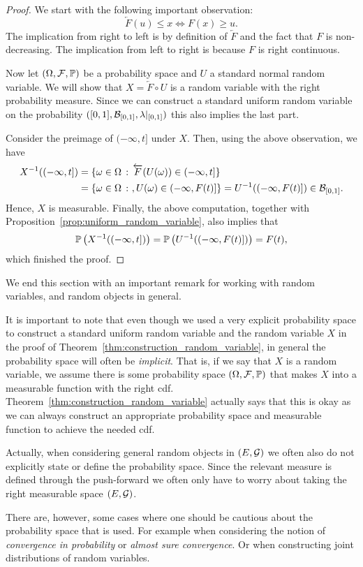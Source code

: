 \begin{proof}
We start with the following important observation: 
\[
	\overleftarrow{F}(u) \le x \iff F(x) \ge u.
\]
The implication from right to left is by definition of $\overleftarrow{F}$ and the fact that $F$ is non-decreasing. The implication from left to right is because $F$ is right continuous.


Now let $(\Omega,\mathcal F, \mathbb P)$ be a probability space and $U$ a standard normal random variable. We will show that $X = \overleftarrow{F} \circ U$ is a random variable with the right probability measure. Since we can construct a standard uniform random variable on the probability $([0,1], \mathcal B_{[0,1]}, \lambda|_{[0,1]})$ this also implies the last part. 

Consider the preimage of $(-\infty, t]$ under $X$. Then, using the above observation, we have
\begin{align*}
	X^{-1}((-\infty,t]) &= \{\omega \in \Omega \, : \, \overleftarrow{F}(U(\omega)) \in (-\infty,t]\}\\
	&= \{\omega \in \Omega \, :\ , U(\omega) \in (-\infty, F(t)]\} = U^{-1}((-\infty, F(t)]) \in \mathcal B_{[0,1]}.
\end{align*}
Hence, $X$ is measurable. Finally, the above computation, together with Proposition~\ref{prop:uniform_random_variable}, also implies that
\[
	\mathbb P\left(X^{-1}((-\infty,t])\right) = \mathbb P\left(U^{-1}((-\infty, F(t)])\right) = F(t),
\]
which finished the proof.
\end{proof}

We end this section with an important remark for working with random variables, and random objects in general.

\begin{remark}
It is important to note that even though we used a very explicit probability space to construct a standard uniform random variable and the random variable $X$ in the proof of Theorem~\ref{thm:construction_random_variable}, in general the probability space will often be \emph{implicit}. That is, if we say that $X$ is a random variable, we assume there is some probability space $(\Omega,\mathcal F, \mathbb P)$ that makes $X$ into a measurable function with the right cdf. Theorem~\ref{thm:construction_random_variable} actually says that this is okay as we can always construct an appropriate probability space and measurable function to achieve the needed cdf.

Actually, when considering general random objects in $(E, \mathcal G)$ we often also do not explicitly state or define the probability space. Since the relevant measure is defined through the push-forward we often only have to worry about taking the right measurable space $(E, \mathcal G)$.

There are, however, some cases where one should be cautious about the probability space that is used. For example when considering the notion of \emph{convergence in probability} or \emph{almost sure convergence}. Or when constructing joint distributions of random variables. 
\end{remark}

